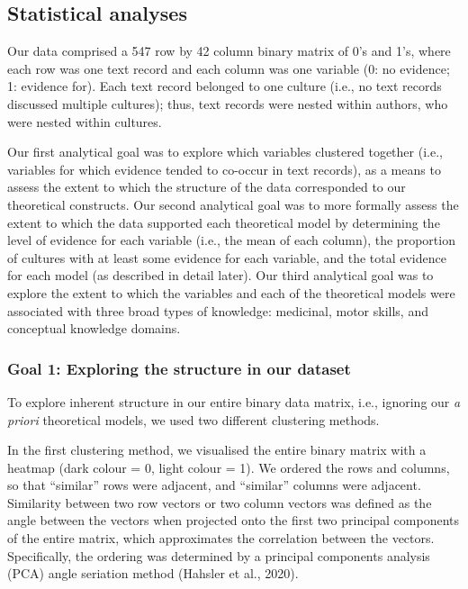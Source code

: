 \documentclass[
  11pt,
]{article}
\begin{document}
\hypertarget{statistical-analyses}{%
\subsection{Statistical analyses}\label{statistical-analyses}}

Our data comprised a 547 row by 42 column binary matrix of 0's and 1's, where each row was one text record and each column was one variable (0: no evidence; 1: evidence for). Each text record belonged to one culture (i.e., no text records discussed multiple cultures); thus, text records were nested within authors, who were nested within cultures.

Our first analytical goal was to explore which variables clustered together (i.e., variables for which evidence tended to co-occur in text records), as a means to assess the extent to which the structure of the data corresponded to our theoretical constructs. Our second analytical goal was to more formally assess the extent to which the data supported each theoretical model by determining the level of evidence for each variable (i.e., the mean of each column), the proportion of cultures with at least some evidence for each variable, and the total evidence for each model (as described in detail later). Our third analytical goal was to explore the extent to which the variables and each of the theoretical models were associated with three broad types of knowledge: medicinal, motor skills, and conceptual knowledge domains.

\hypertarget{goal-1-exploring-the-structure-in-our-dataset}{%
\subsubsection{Goal 1: Exploring the structure in our dataset}\label{goal-1-exploring-the-structure-in-our-dataset}}

To explore inherent structure in our entire binary data matrix, i.e., ignoring our \emph{a priori} theoretical models, we used two different clustering methods.

In the first clustering method, we visualised the entire binary matrix with a heatmap (dark colour = 0, light colour = 1). We ordered the rows and columns, so that ``similar'' rows were adjacent, and ``similar'' columns were adjacent. Similarity between two row vectors or two column vectors was defined as the angle between the vectors when projected onto the first two principal components of the entire matrix, which approximates the correlation between the vectors. Specifically, the ordering was determined by a principal components analysis (PCA) angle seriation method (Hahsler et al., 2020).
\end{document}
